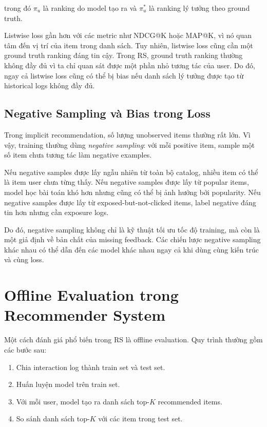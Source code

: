 \documentclass[12pt,a4paper]{article}
\begin{document}
trong đó $\pi_u$ là ranking do model tạo ra và $\pi_u^*$ là ranking lý tưởng theo ground truth.

Listwise loss gần hơn với các metric như NDCG@K hoặc MAP@K, vì nó quan tâm đến vị trí của item trong danh sách. Tuy nhiên, listwise loss cũng cần một ground truth ranking đáng tin cậy. Trong RS, ground truth ranking thường không đầy đủ vì ta chỉ quan sát được một phần nhỏ tương tác của user. Do đó, ngay cả listwise loss cũng có thể bị bias nếu danh sách lý tưởng được tạo từ historical logs không đầy đủ.

\subsection{Negative Sampling và Bias trong Loss}

Trong implicit recommendation, số lượng unobserved items thường rất lớn. Vì vậy, training thường dùng \textit{negative sampling}: với mỗi positive item, sample một số item chưa tương tác làm negative examples.

Nếu negative samples được lấy ngẫu nhiên từ toàn bộ catalog, nhiều item có thể là item user chưa từng thấy. Nếu negative samples được lấy từ popular items, model học bài toán khó hơn nhưng cũng có thể bị ảnh hưởng bởi popularity. Nếu negative samples được lấy từ exposed-but-not-clicked items, label negative đáng tin hơn nhưng cần exposure logs.

Do đó, negative sampling không chỉ là kỹ thuật tối ưu tốc độ training, mà còn là một giả định về bản chất của missing feedback. Các chiến lược negative sampling khác nhau có thể dẫn đến các model khác nhau ngay cả khi dùng cùng kiến trúc và cùng loss.

\section{Offline Evaluation trong Recommender System}

Một cách đánh giá phổ biến trong RS là offline evaluation. Quy trình thường gồm các bước sau:

\begin{enumerate}[leftmargin=*]
    \item Chia interaction log thành train set và test set.
    \item Huấn luyện model trên train set.
    \item Với mỗi user, model tạo ra danh sách top-$K$ recommended items.
    \item So sánh danh sách top-$K$ với các item trong test set.
\end{enumerate}
\end{document}
